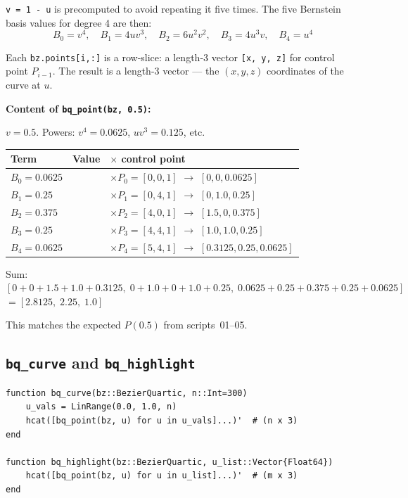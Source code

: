 \documentclass[12pt, a4paper]{article}
\newcommand{\cd}[1]{\texttt{#1}}
\begin{document}
\cd{v = 1 - u} is precomputed to avoid repeating it five
times.
The five Bernstein basis values for degree 4 are then:
\[
  B_0 = v^4,\quad
  B_1 = 4uv^3,\quad
  B_2 = 6u^2v^2,\quad
  B_3 = 4u^3v,\quad
  B_4 = u^4
\]

Each \cd{bz.points[i,:]} is a row-slice: a length-3 vector
\cd{[x, y, z]} for control point $P_{i-1}$.
The result is a length-3 vector --- the $(x, y, z)$
coordinates of the curve at $u$.

\begin{examplebox}
\textbf{Content of \cd{bq\_point(bz, 0.5)}:}

$v = 0.5$. Powers: $v^4 = 0.0625$, $uv^3 = 0.125$, etc.

\medskip
\begin{tabular}{lll}
\toprule
Term & Value & $\times$ control point \\
\midrule
$B_0 = 0.0625$ & & $\times P_0 = [0,0,1]$ $\to$ $[0, 0, 0.0625]$ \\
$B_1 = 0.25$   & & $\times P_1 = [0,4,1]$ $\to$ $[0, 1.0, 0.25]$ \\
$B_2 = 0.375$  & & $\times P_2 = [4,0,1]$ $\to$ $[1.5, 0, 0.375]$ \\
$B_3 = 0.25$   & & $\times P_3 = [4,4,1]$ $\to$ $[1.0, 1.0, 0.25]$ \\
$B_4 = 0.0625$ & & $\times P_4 = [5,4,1]$ $\to$ $[0.3125, 0.25, 0.0625]$ \\
\bottomrule
\end{tabular}

\medskip
Sum: $[0+0+1.5+1.0+0.3125,\;
       0+1.0+0+1.0+0.25,\;
       0.0625+0.25+0.375+0.25+0.0625]$
$= [2.8125,\; 2.25,\; 1.0]$

This matches the expected $P(0.5)$ from scripts~01--05.
\checkmark
\end{examplebox}

\subsection{\texttt{bq\_curve} and \texttt{bq\_highlight}}

\begin{verbatim}
function bq_curve(bz::BezierQuartic, n::Int=300)
    u_vals = LinRange(0.0, 1.0, n)
    hcat([bq_point(bz, u) for u in u_vals]...)'  # (n x 3)
end

function bq_highlight(bz::BezierQuartic, u_list::Vector{Float64})
    hcat([bq_point(bz, u) for u in u_list]...)'  # (m x 3)
end
\end{verbatim}
\end{document}
